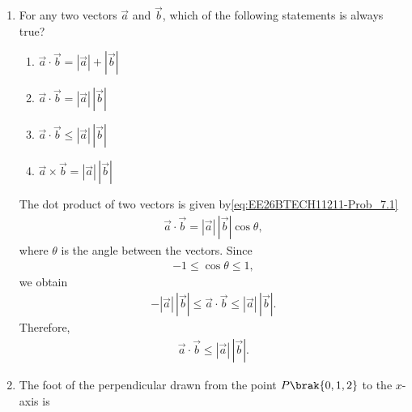 \begin{enumerate}[label=\thesubsection.\arabic*, ref=\thesubsection.\theenumi]
\solution
A first-order differential equation of the form
\begin{align}
\frac{dy}{dx}=F\brak{x,y}
\end{align}
is homogeneous if $F\brak{x,y}$ can be expressed as a
function of $\dfrac{y}{x}$ alone.
For option ,
\begin{align}
\frac{dy}{dx}=\frac{x+y}{x-y}.
\end{align}

Dividing the numerator and denominator by $x$, we get
\begin{align}
\frac{dy}{dx}
=\frac{1+\dfrac{y}{x}}{1-\dfrac{y}{x}}.
\end{align}
The right-hand side is a function of $\dfrac{y}{x}$
alone.
\\Therefore, the differential equation in option 
is homogeneous.

\item
For any two vectors $\vec{a}$ and $\vec{b}$, which of
the following statements is always true?

\begin{enumerate}
    \item $\vec{a}\cdot\vec{b}
    =|\vec{a}|+|\vec{b}|$
    \item $\vec{a}\cdot\vec{b}
    = |\vec{a}|\,|\vec{b}|$   
    \item $\vec{a}\cdot\vec{b}
    \leq |\vec{a}|\,|\vec{b}|$    
    \item $\vec{a}\times\vec{b}
    =|\vec{a}|\,|\vec{b}|$
\end{enumerate}

\solution
The dot product of two vectors is given by\eqref{eq:EE26BTECH11211-Prob_7.1}
\begin{align}
\vec{a}\cdot\vec{b}
=|\vec{a}|\,|\vec{b}|\cos\theta,
\end{align}
where $\theta$ is the angle between the vectors.
Since
\begin{align}
-1\leq\cos\theta\leq1,
\end{align}
we obtain
\begin{align}
-|\vec{a}|\,|\vec{b}|
\leq\vec{a}\cdot\vec{b}
\leq|\vec{a}|\,|\vec{b}|.
\end{align}
Therefore,
\begin{align}
\vec{a}\cdot\vec{b}
\leq|\vec{a}|\,|\vec{b}|.
\end{align}

\item
The foot of the perpendicular drawn from the point
$P\brak{0,1,2}$ to the $x$-axis is


\end{enumerate}
